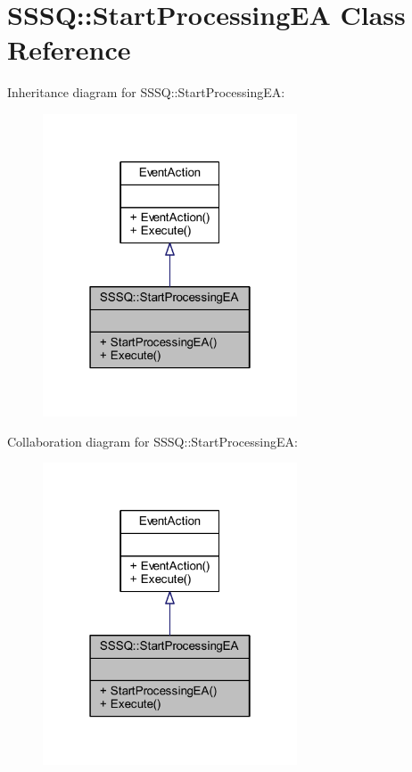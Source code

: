 \hypertarget{class_s_s_s_q_1_1_start_processing_e_a}{}\section{S\+S\+SQ\+:\+:Start\+Processing\+EA Class Reference}
\label{class_s_s_s_q_1_1_start_processing_e_a}


Inheritance diagram for S\+S\+SQ\+:\+:Start\+Processing\+EA\+:
\nopagebreak
\begin{figure}[H]
\begin{center}
\leavevmode
\includegraphics[width=214pt]{class_s_s_s_q_1_1_start_processing_e_a__inherit__graph}
\end{center}
\end{figure}


Collaboration diagram for S\+S\+SQ\+:\+:Start\+Processing\+EA\+:
\nopagebreak
\begin{figure}[H]
\begin{center}
\leavevmode
\includegraphics[width=214pt]{class_s_s_s_q_1_1_start_processing_e_a__coll__graph}
\end{center}
\end{figure}
